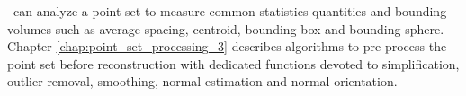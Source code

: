 \cgal\ can analyze a point set to measure common statistics quantities and bounding volumes such as average spacing, centroid, bounding box and bounding sphere. Chapter  \ref{chap:point_set_processing_3} describes algorithms to pre-process the point set before reconstruction with dedicated functions devoted to simplification, outlier removal, smoothing, normal estimation and normal orientation.


